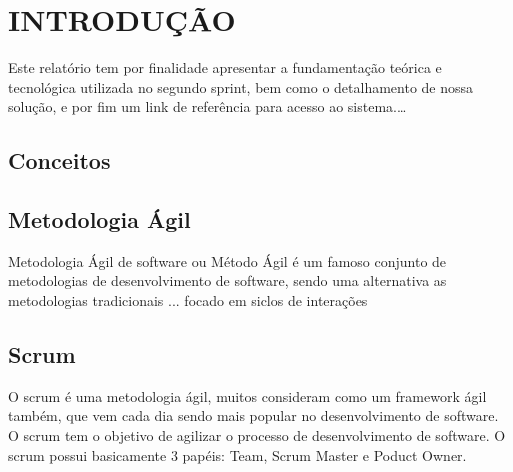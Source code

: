\documentclass{abnt}
\begin{document}






\capa

\folhaderosto

\tableofcontents


\chapter{INTRODUÇÃO}

	Este relatório tem por finalidade apresentar a fundamentação teórica e tecnológica utilizada no segundo sprint, bem como o detalhamento de nossa solução, e por fim um link de referência para acesso ao sistema.\ldots


	\section{Conceitos}
	\blindtext
	
	\section{Metodologia Ágil}
	
		Metodologia Ágil de software ou Método Ágil é um famoso conjunto de metodologias de desenvolvimento de software, sendo uma alternativa as metodologias tradicionais  ... focado em siclos de interações 
	
	\blindtext
	
	\section{Scrum}
		O scrum é uma metodologia ágil, muitos consideram como um framework ágil também, que vem cada dia sendo mais popular
		no desenvolvimento de software.
		O scrum tem o objetivo de agilizar o processo de desenvolvimento de software. O scrum possui basicamente 3
		papéis: Team, Scrum Master e Poduct Owner.
		
\end{document}
